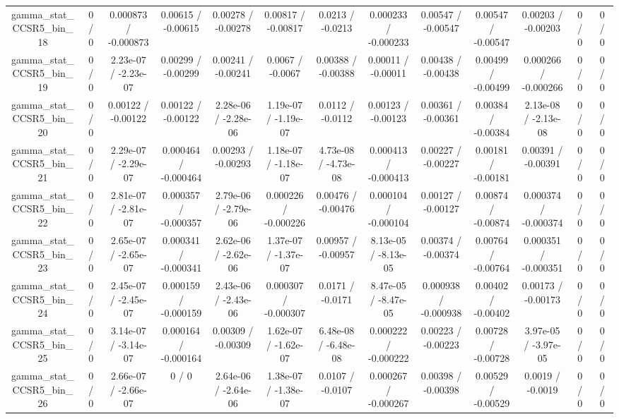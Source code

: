 \documentclass[10pt]{article}
\begin{document}
\begin{table}[htbp]
\begin{center}
\begin{tabular}{|c|c|c|c|c|c|c|c|c|c|c|c|c|}
  gamma_stat_CCSR5_bin_18 & 0 / 0 & 0.000873 / -0.000873 & 0.00615 / -0.00615 & 0.00278 / -0.00278 & 0.00817 / -0.00817 & 0.0213 / -0.0213 & 0.000233 / -0.000233 & 0.00547 / -0.00547 & 0.00547 / -0.00547 & 0.00203 / -0.00203 & 0 / 0 & 0 / 0 \\ 
  gamma_stat_CCSR5_bin_19 & 0 / 0 & 2.23e-07 / -2.23e-07 & 0.00299 / -0.00299 & 0.00241 / -0.00241 & 0.0067 / -0.0067 & 0.00388 / -0.00388 & 0.00011 / -0.00011 & 0.00438 / -0.00438 & 0.00499 / -0.00499 & 0.000266 / -0.000266 & 0 / 0 & 0 / 0 \\ 
  gamma_stat_CCSR5_bin_20 & 0 / 0 & 0.00122 / -0.00122 & 0.00122 / -0.00122 & 2.28e-06 / -2.28e-06 & 1.19e-07 / -1.19e-07 & 0.0112 / -0.0112 & 0.00123 / -0.00123 & 0.00361 / -0.00361 & 0.00384 / -0.00384 & 2.13e-08 / -2.13e-08 & 0 / 0 & 0 / 0 \\ 
  gamma_stat_CCSR5_bin_21 & 0 / 0 & 2.29e-07 / -2.29e-07 & 0.000464 / -0.000464 & 0.00293 / -0.00293 & 1.18e-07 / -1.18e-07 & 4.73e-08 / -4.73e-08 & 0.000413 / -0.000413 & 0.00227 / -0.00227 & 0.00181 / -0.00181 & 0.00391 / -0.00391 & 0 / 0 & 0 / 0 \\ 
  gamma_stat_CCSR5_bin_22 & 0 / 0 & 2.81e-07 / -2.81e-07 & 0.000357 / -0.000357 & 2.79e-06 / -2.79e-06 & 0.000226 / -0.000226 & 0.00476 / -0.00476 & 0.000104 / -0.000104 & 0.00127 / -0.00127 & 0.00874 / -0.00874 & 0.000374 / -0.000374 & 0 / 0 & 0 / 0 \\ 
  gamma_stat_CCSR5_bin_23 & 0 / 0 & 2.65e-07 / -2.65e-07 & 0.000341 / -0.000341 & 2.62e-06 / -2.62e-06 & 1.37e-07 / -1.37e-07 & 0.00957 / -0.00957 & 8.13e-05 / -8.13e-05 & 0.00374 / -0.00374 & 0.00764 / -0.00764 & 0.000351 / -0.000351 & 0 / 0 & 0 / 0 \\ 
  gamma_stat_CCSR5_bin_24 & 0 / 0 & 2.45e-07 / -2.45e-07 & 0.000159 / -0.000159 & 2.43e-06 / -2.43e-06 & 0.000307 / -0.000307 & 0.0171 / -0.0171 & 8.47e-05 / -8.47e-05 & 0.000938 / -0.000938 & 0.00402 / -0.00402 & 0.00173 / -0.00173 & 0 / 0 & 0 / 0 \\ 
  gamma_stat_CCSR5_bin_25 & 0 / 0 & 3.14e-07 / -3.14e-07 & 0.000164 / -0.000164 & 0.00309 / -0.00309 & 1.62e-07 / -1.62e-07 & 6.48e-08 / -6.48e-08 & 0.000222 / -0.000222 & 0.00223 / -0.00223 & 0.00728 / -0.00728 & 3.97e-05 / -3.97e-05 & 0 / 0 & 0 / 0 \\ 
  gamma_stat_CCSR5_bin_26 & 0 / 0 & 2.66e-07 / -2.66e-07 & 0 / 0 & 2.64e-06 / -2.64e-06 & 1.38e-07 / -1.38e-07 & 0.0107 / -0.0107 & 0.000267 / -0.000267 & 0.00398 / -0.00398 & 0.00529 / -0.00529 & 0.0019 / -0.0019 & 0 / 0 & 0 / 0 \\ 

\end{tabular}
\end{center}
\end{table}
\end{document}
